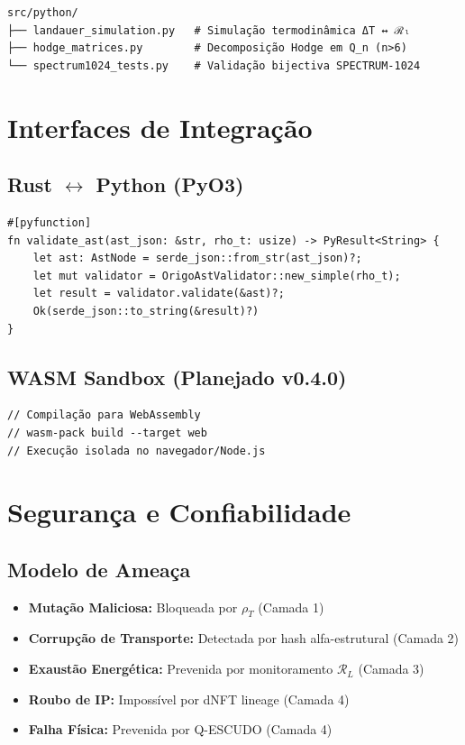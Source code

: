 \documentclass[11pt,a4paper]{article}
\newcommand{\rhoT}{\rho_T}
\newcommand{\RL}{\mathcal{R}_L}
\begin{document}
\begin{lstlisting}[caption=Scripts Python Principais]
src/python/
├── landauer_simulation.py   # Simulação termodinâmica ΔT ↔ ℛₗ
├── hodge_matrices.py        # Decomposição Hodge em Q_n (n>6)
└── spectrum1024_tests.py    # Validação bijectiva SPECTRUM-1024
\end{lstlisting}

\section{Interfaces de Integração}

\subsection{Rust $\leftrightarrow$ Python (PyO3)}

\begin{lstlisting}
#[pyfunction]
fn validate_ast(ast_json: &str, rho_t: usize) -> PyResult<String> {
    let ast: AstNode = serde_json::from_str(ast_json)?;
    let mut validator = OrigoAstValidator::new_simple(rho_t);
    let result = validator.validate(&ast)?;
    Ok(serde_json::to_string(&result)?)
}
\end{lstlisting}

\subsection{WASM Sandbox (Planejado v0.4.0)}

\begin{lstlisting}
// Compilação para WebAssembly
// wasm-pack build --target web
// Execução isolada no navegador/Node.js
\end{lstlisting}

\section{Segurança e Confiabilidade}

\subsection{Modelo de Ameaça}

\begin{itemize}
    \item \textbf{Mutação Maliciosa:} Bloqueada por $\rhoT$ (Camada 1)
    \item \textbf{Corrupção de Transporte:} Detectada por hash alfa-estrutural (Camada 2)
    \item \textbf{Exaustão Energética:} Prevenida por monitoramento $\RL$ (Camada 3)
    \item \textbf{Roubo de IP:} Impossível por dNFT lineage (Camada 4)
    \item \textbf{Falha Física:} Prevenida por Q-ESCUDO (Camada 4)
\end{itemize}
\end{document}
